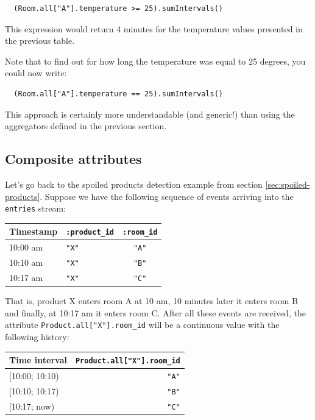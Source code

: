 \documentclass[a4,11pt]{report}
\begin{document}
\begin{lstlisting}
  (Room.all["A"].temperature >= 25).sumIntervals()
\end{lstlisting}

This expression would return 4 minutes for the temperature values
presented in the previous table.

Note that to find out for how long the temperature was equal to 25
degrees, you could now write:

\begin{lstlisting}
  (Room.all["A"].temperature == 25).sumIntervals()
\end{lstlisting}

This approach is certainly more understandable (and generic!) than
using the aggregators defined in the previous section.

\subsection{Composite attributes}

Let's go back to the spoiled products detection example from section
\ref{sec:spoiled-products}. Suppose we have the following
sequence of events arriving into the \verb=entries= stream:

\begin{tabular}{ |l|l|c| }
  \hline
  Timestamp & \verb=:product_id= & \verb=:room_id= \\
  \hline
  10:00 am & \verb="X"= & \verb="A"= \\
  10:10 am & \verb="X"= & \verb="B"= \\
  10:17 am & \verb="X"= & \verb="C"= \\
  \hline
\end{tabular}

That is, product X enters room A at 10 am, 10 minutes later it enters
room B and finally, at 10:17 am it enters room C. After all these
events are received, the attribute \verb=Product.all["X"].room_id=
will be a continuous value with the following history:

\begin{tabular}{ |l|r| }
  \hline
  Time interval & \verb=Product.all["X"].room_id= \\
  \hline
  $[$10:00; 10:10) & \verb="A"= \\
  $[$10:10; 10:17) & \verb="B"= \\
  $[$10:17;   now) & \verb="C"= \\
  \hline
\end{tabular}
\end{document}
